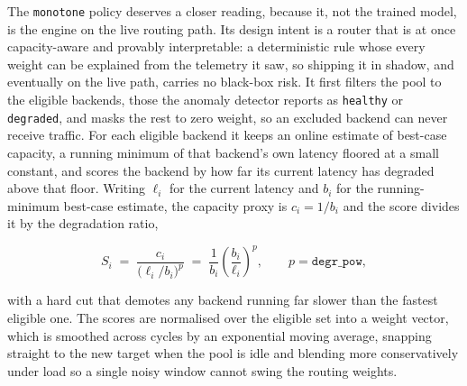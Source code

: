 The \texttt{monotone} policy deserves a closer reading, because it, not the trained
model, is the engine on the live routing path. Its design intent is a router that
is at once capacity-aware and provably interpretable: a deterministic rule whose
every weight can be explained from the telemetry it saw, so shipping it in shadow,
and eventually on the live path, carries no black-box risk. It first filters the
pool to the eligible backends, those the anomaly detector reports as
\texttt{healthy} or \texttt{degraded}, and masks the rest to zero weight, so an
excluded backend can never receive traffic. For each eligible backend it keeps an
online estimate of best-case capacity, a running minimum of that backend's own
latency floored at a small constant, and scores the backend by how far its current
latency has degraded above that floor. Writing $\ell_i$ for the current latency and
$b_i$ for the running-minimum best-case estimate, the capacity proxy is
$c_i = 1/b_i$ and the score divides it by the degradation ratio,

\begin{equation}\label{imb:eq:mono-score}
  S_i \;=\; \frac{c_i}{\big(\ell_i / b_i\big)^{p}}
        \;=\; \frac{1}{b_i}\left(\frac{b_i}{\ell_i}\right)^{p},
  \qquad p = \texttt{degr\_pow},
\end{equation}

with a hard cut that demotes any backend running far slower than the fastest
eligible one. The scores are normalised over the eligible set into a weight vector,
which is smoothed across cycles by an exponential moving average, snapping straight
to the new target when the pool is idle and blending more conservatively under load
so a single noisy window cannot swing the routing weights.

